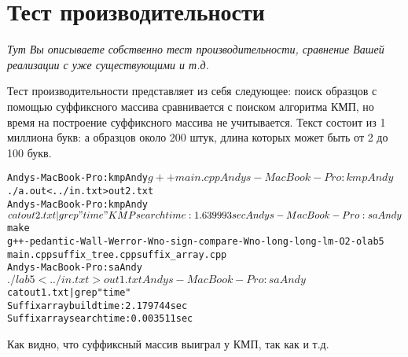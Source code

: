 \section{Тест производительности}
{\itshape Тут Вы описываете собственно тест производительности, сравнение Вашей реализации с уже существующими и т.д.}


Тест производительности представляет из себя следующее: поиск образцов с помощью суффиксного массива сравнивается с поиском алгоритма КМП, но время на построение суффиксного массива не учитывается. Текст состоит из 1 миллиона букв: а образцов около 200 штук, длина которых может быть от 2 до 100 букв.

\begin{alltt}
Andys-MacBook-Pro:kmp Andy$ g++ main.cpp
Andys-MacBook-Pro:kmp Andy$ ./a.out <../in.txt >out2.txt
Andys-MacBook-Pro:kmp Andy$ cat out2.txt | grep "time"
KMP search time: 1.639993 sec
Andys-MacBook-Pro:sa Andy$ make
g++ -pedantic -Wall -Werror -Wno-sign-compare -Wno-long-long -lm -O2 -o lab5
main.cpp suffix_tree.cpp suffix_array.cpp
Andys-MacBook-Pro:sa Andy$ ./lab5 <../in.txt >out1.txt
Andys-MacBook-Pro:sa Andy$ cat out1.txt | grep "time"
Suffix array build time: 2.179744 sec
Suffix array search time: 0.003511 sec
\end{alltt}

Как видно, что суффиксный массив выиграл у КМП, так как и т.д.

\pagebreak

